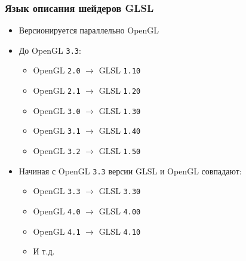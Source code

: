 \documentclass[10pt]{beamer}
\begin{document}
\begin{frame}[fragile]
\frametitle{Язык описания шейдеров GLSL}
\begin{itemize}
\item Версионируется параллельно OpenGL
\pause
\item До OpenGL \texttt{3.3}:
\begin{itemize}
\item OpenGL \texttt{2.0} \begin{math}\rightarrow\end{math} GLSL \texttt{1.10}
\item OpenGL \texttt{2.1} \begin{math}\rightarrow\end{math} GLSL \texttt{1.20}
\item OpenGL \texttt{3.0} \begin{math}\rightarrow\end{math} GLSL \texttt{1.30}
\item OpenGL \texttt{3.1} \begin{math}\rightarrow\end{math} GLSL \texttt{1.40}
\item OpenGL \texttt{3.2} \begin{math}\rightarrow\end{math} GLSL \texttt{1.50}
\end{itemize}
\pause
\item Начиная с OpenGL \texttt{3.3} версии GLSL и OpenGL совпадают:
\begin{itemize}
\item OpenGL \texttt{3.3} \begin{math}\rightarrow\end{math} GLSL \texttt{3.30}
\item OpenGL \texttt{4.0} \begin{math}\rightarrow\end{math} GLSL \texttt{4.00}
\item OpenGL \texttt{4.1} \begin{math}\rightarrow\end{math} GLSL \texttt{4.10}
\item И т.д.
\end{itemize}
\end{itemize}
\end{frame}
\end{document}
